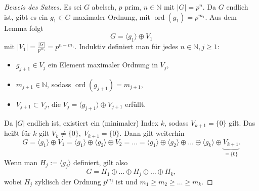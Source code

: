 \documentclass[12pt]{scrartcl} %
\DeclareMathOperator{\ord}{ord}
\theoremstyle{definition}
\theoremstyle{remark}
\begin{document}
\begin{proof}[Beweis des Satzes]
	Es sei $G$ abelsch, $p$ prim, $n\in\mathbb{N}$ mit $|G|=p^n$. Da $G$ endlich ist, gibt es ein $g_1\in G$ maximaler Ordnung, mit $\ord(g_1)=p^{m_1}$. Aus dem Lemma folgt
	\[ G=\langle g_1\rangle\oplus V_1 \]
	mit $|V_1|=\frac{|G|}{p^{m_1}}=p^{n-m_1}$. Induktiv definiert man für jedes $n\in\mathbb{N},j\geq 1$:
	\begin{itemize}
		\item $g_{j+1}\in V_j$ ein Element maximaler Ordnung in $V_j$,
		\item $m_{j+1}\in\mathbb{N}$, sodass $\ord(g_{j+1})=m_{j+1}$,
		\item $V_{j+1}\subset V_j$, die $V_j=\langle g_{j+1}\rangle\oplus V_{j+1}$ erfüllt.
	\end{itemize}
	Da $|G|$ endlich ist, existiert ein (minimaler) Index $k$, sodass $V_{k+1}=\{0\}$ gilt. Das heißt für $k$ gilt $V_k\neq \{0\},\; V_{k+1}=\{0\}$. Dann gilt weiterhin
	\[ 
        G 
        = \langle g_1\rangle\oplus V_1 
        = \langle g_1\rangle\oplus\langle g_2\rangle\oplus V_2 
        = \dots 
        = \langle g_1\rangle\oplus\langle g_2\rangle\oplus\dots\oplus\langle g_k\rangle\oplus \underbrace{V_{k+1}}_{=\{0\}}.\]
	Wenn man $H_j:=\langle g_j\rangle$ definiert, gilt also
	\[ G = H_1\oplus\dots\oplus H_j\oplus\dots\oplus H_k,\]
	wobei $H_j$ zyklisch der Ordnung $p^{m_j}$ ist und $m_1\geq m_2\geq\dots\geq m_k$. 
        

\end{proof}
\end{document}
